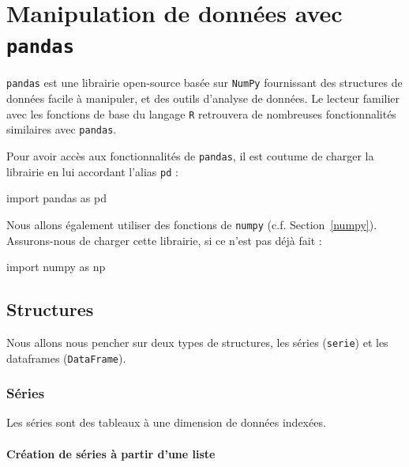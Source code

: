 \documentclass[12pt,]{book}
\newenvironment{Shaded}{\begin{snugshade}}{\end{snugshade}}
\newcommand{\ImportTok}[1]{#1}
\newcommand{\NormalTok}[1]{#1}
\numberwithin{equation}{section}
\numberwithin{countremarque}{section}
\begin{document}
\chapter{\texorpdfstring{Manipulation de données avec
\texttt{pandas}}{Manipulation de données avec pandas}}\label{pandas}

\texttt{pandas} est une librairie open-source basée sur \texttt{NumPy}
fournissant des structures de données facile à manipuler, et des outils
d'analyse de données. Le lecteur familier avec les fonctions de base du
langage \texttt{R} retrouvera de nombreuses fonctionnalités similaires
avec \texttt{pandas}.

Pour avoir accès aux fonctionnalités de \texttt{pandas}, il est coutume
de charger la librairie en lui accordant l'alias \texttt{pd} :

\begin{Shaded}
\begin{Highlighting}[]
\ImportTok{import}\NormalTok{ pandas }\ImportTok{as}\NormalTok{ pd}
\end{Highlighting}
\end{Shaded}

Nous allons également utiliser des fonctions de \texttt{numpy} (c.f.
Section~\ref{numpy}). Assurons-nous de charger cette librairie, si ce
n'est pas déjà fait :

\begin{Shaded}
\begin{Highlighting}[]
\ImportTok{import}\NormalTok{ numpy }\ImportTok{as}\NormalTok{ np}
\end{Highlighting}
\end{Shaded}

\section{Structures}\label{structures-1}

Nous allons nous pencher sur deux types de structures, les séries
(\texttt{serie}) et les dataframes (\texttt{DataFrame}).

\subsection{Séries}\label{series}

Les séries sont des tableaux à une dimension de données indexées.

\subsubsection{Création de séries à partir d'une
liste}\label{creation-de-series-a-partir-dune-liste}
\end{document}
